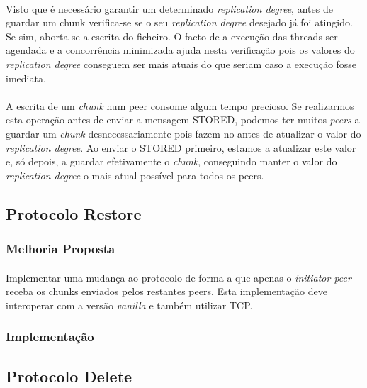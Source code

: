 \documentclass[11pt,oneside]{book}
\begin{document}
\paragraph{}
    Visto que é necessário garantir um determinado \textit{replication degree},
    antes de guardar um chunk verifica-se se o seu \textit{replication degree}
    desejado já foi atingido. Se sim, aborta-se a escrita do ficheiro. O facto de
    a execução das threads ser agendada e a concorrência minimizada ajuda nesta 
    verificação pois os valores do \textit{replication degree} conseguem ser mais
    atuais do que seriam caso a execução fosse imediata.
\paragraph{}
    A escrita de um \textit{chunk} num peer consome algum tempo precioso. Se
    realizarmos esta operação antes de enviar a mensagem STORED, podemos ter muitos
    \textit{peers} a guardar um \textit{chunk} desnecessariamente pois fazem-no
    antes de atualizar o valor do \textit{replication degree}. Ao enviar o STORED
    primeiro, estamos a atualizar este valor e, só depois, a guardar efetivamente o
    \textit{chunk}, conseguindo manter o valor do \textit{replication degree} o
    mais atual possível para todos os peers. 
 
\pagebreak

\subsection{Protocolo Restore}

\subsubsection{Melhoria Proposta}
\paragraph{}
Implementar uma mudança ao protocolo de forma a que apenas o 
\textit{initiator peer} receba os chunks enviados pelos restantes peers. 
Esta implementação deve interoperar com a versão \textit{vanilla} e também
utilizar TCP.

\subsubsection{Implementação}

\pagebreak

\subsection{Protocolo Delete}
\end{document}
